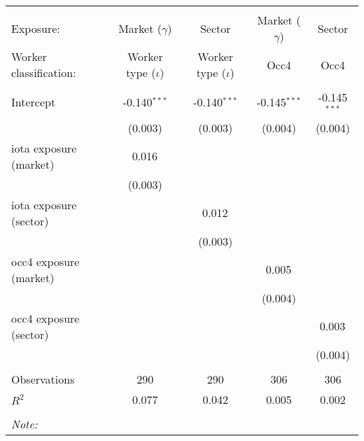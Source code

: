 \begin{tabular}{@{\extracolsep{5pt}}lcccc}
\\[-1.8ex]\hline
\hline \\[-1.8ex]
\hline \\[-1.8ex]
 Exposure: & Market ($\gamma$) & Sector & Market ($\gamma$) & Sector \\
 Worker classification: & Worker type ($\iota$) & Worker type ($\iota$) & Occ4 & Occ4 \\
 \hline &  &  &  &  \\
 Intercept & -0.140$^{***}$ & -0.140$^{***}$ & -0.145$^{***}$ & -0.145$^{***}$ \\
  & (0.003) & (0.003) & (0.004) & (0.004) \\
 iota exposure (market) & 0.016$^{}$ & & & \\
  & (0.003) & & & \\
 iota exposure (sector) & & 0.012$^{}$ & & \\
  & & (0.003) & & \\
 occ4 exposure (market) & & & 0.005$^{}$ & \\
  & & & (0.004) & \\
 occ4 exposure (sector) & & & & 0.003$^{}$ \\
  & & & & (0.004) \\
\hline \\[-1.8ex]
 Observations & 290 & 290 & 306 & 306 \\
 $R^2$ & 0.077 & 0.042 & 0.005 & 0.002 \\
\hline
\hline \\[-1.8ex]
\textit{Note:}\end{tabular}